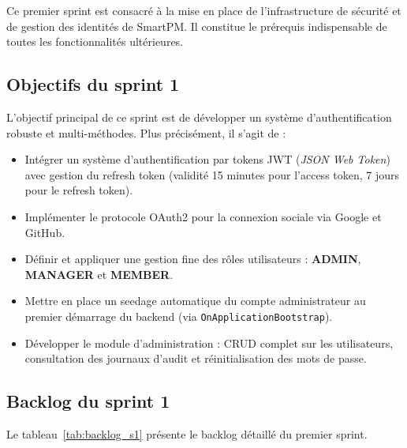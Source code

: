Ce premier sprint est consacr\'e \`a la mise en place de l'infrastructure
de s\'ecurit\'e et de gestion des identit\'es de SmartPM. Il constitue le
pr\'erequis indispensable de toutes les fonctionnalit\'es ult\'erieures.

\subsection{Objectifs du sprint 1}

L'objectif principal de ce sprint est de d\'evelopper un syst\`eme
d'authentification robuste et multi-m\'ethodes. Plus pr\'ecis\'ement, il
s'agit de :

\begin{itemize}
  \item Int\'egrer un syst\`eme d'authentification par tokens JWT
        (\textit{JSON Web Token}) avec gestion du refresh token (validit\'e
        15 minutes pour l'access token, 7 jours pour le refresh token).
  \item Impl\'ementer le protocole OAuth2 pour la connexion sociale
        via Google et GitHub.
  \item D\'efinir et appliquer une gestion fine des r\^oles utilisateurs :
        \textbf{ADMIN}, \textbf{MANAGER} et \textbf{MEMBER}.
  \item Mettre en place un seedage automatique du compte administrateur
        au premier d\'emarrage du backend (via \texttt{OnApplicationBootstrap}).
  \item D\'evelopper le module d'administration : CRUD complet sur les
        utilisateurs, consultation des journaux d'audit et r\'einitialisation
        des mots de passe.
\end{itemize}

\subsection{Backlog du sprint 1}

Le tableau~\ref{tab:backlog_s1} pr\'esente le backlog d\'etaill\'e du premier sprint.

